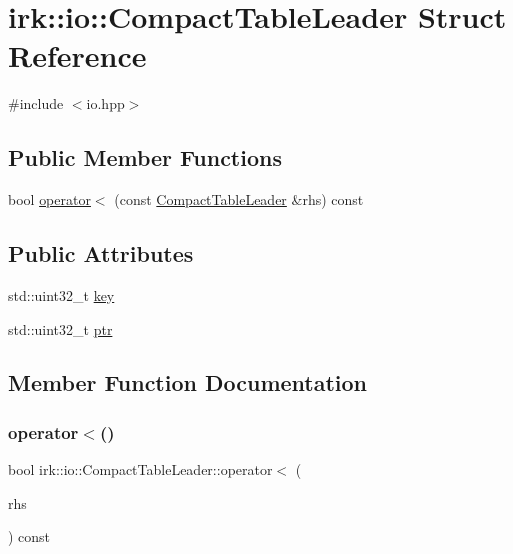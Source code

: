 \hypertarget{structirk_1_1io_1_1CompactTableLeader}{}\section{irk\+:\+:io\+:\+:Compact\+Table\+Leader Struct Reference}
\label{structirk_1_1io_1_1CompactTableLeader}


{\ttfamily \#include $<$io.\+hpp$>$}

\subsection*{Public Member Functions}
\begin{DoxyCompactItemize}
\item 
bool \mbox{\hyperlink{structirk_1_1io_1_1CompactTableLeader_a4e2f58844ee73987e23c12d8455d1ce9}{operator$<$}} (const \mbox{\hyperlink{structirk_1_1io_1_1CompactTableLeader}{Compact\+Table\+Leader}} \&rhs) const
\end{DoxyCompactItemize}
\subsection*{Public Attributes}
\begin{DoxyCompactItemize}
\item 
std\+::uint32\+\_\+t \mbox{\hyperlink{structirk_1_1io_1_1CompactTableLeader_a613e8542af0e1232bd0d8a387cd0b55e}{key}}
\item 
std\+::uint32\+\_\+t \mbox{\hyperlink{structirk_1_1io_1_1CompactTableLeader_a5ea5c1969ff902a6f9544886f1acd9af}{ptr}}
\end{DoxyCompactItemize}


\subsection{Member Function Documentation}
\mbox{\label{structirk_1_1io_1_1CompactTableLeader_a4e2f58844ee73987e23c12d8455d1ce9}} 
\subsubsection{\texorpdfstring{operator$<$()}{operator<()}}
{\footnotesize\ttfamily bool irk\+::io\+::\+Compact\+Table\+Leader\+::operator$<$ (\begin{DoxyParamCaption}\item[{const \mbox{\hyperlink{structirk_1_1io_1_1CompactTableLeader}{Compact\+Table\+Leader}} \&}]{rhs }\end{DoxyParamCaption}) const\hspace{0.3cm}{\ttfamily [inline]}}



